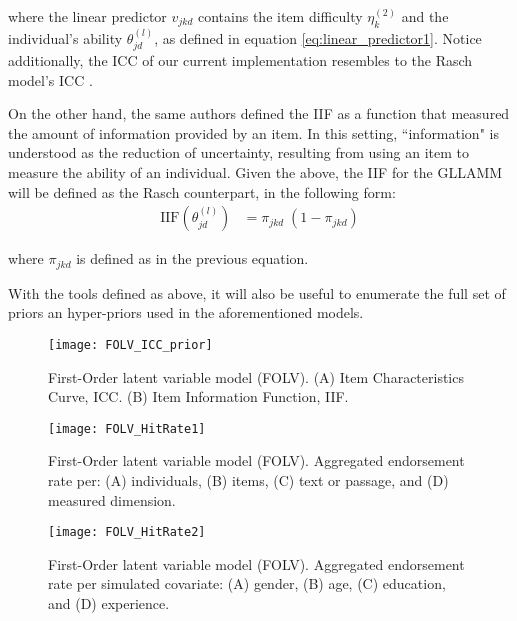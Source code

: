 \noindent where the linear predictor $v_{jkd}$ contains the item difficulty $\eta^{(2)}_{k}$ and the individual's ability $\theta^{(l)}_{jd}$, as defined in equation \ref{eq:linear_predictor1}. Notice additionally, the ICC of our current implementation resembles to the Rasch model's ICC \cite{Rasch_1980}.

On the other hand, the same authors defined the IIF as a function that measured the amount of information provided by an item. In this setting, ``information" is understood as the reduction of uncertainty, resulting from using an item to measure the ability of an individual. Given the above, the IIF for the GLLAMM will be defined as the Rasch counterpart, in the following form:
%
\begin{equation} \label{eq:IIF}
	\begin{split}
		\text{IIF} \left( \theta^{(l)}_{jd} \right) & = \pi_{jkd} \; (1 - \pi_{jkd})
	\end{split}	
\end{equation}

\noindent where $\pi_{jkd}$ is defined as in the previous equation.

With the tools defined as above, it will also be useful to enumerate the full set of priors an hyper-priors used in the aforementioned models.
%
\begin{figure}[H]
	\centering
	\texttt{[image: FOLV\_ICC\_prior]}
	\caption[First-Order latent variable model (FOLV). Item Characteristic Curve (ICC) and Item Information Function (IIF).]%
	{First-Order latent variable model (FOLV). (A) Item Characteristics Curve, ICC. (B) Item Information Function, IIF.}
	\label{fig:FOLV_ICC_prior}
\end{figure}
%
\begin{figure}[H]
	\centering
	\texttt{[image: FOLV\_HitRate1]}
	\caption[First-Order latent variable model (FOLV). Hit rate per dimensions of interest.]%
	{First-Order latent variable model (FOLV). Aggregated endorsement rate per: (A) individuals, (B) items, (C) text or passage, and (D) measured dimension.}
	\label{fig:FOLV_hitrate1}
\end{figure}
%
\begin{figure}[h]
	\centering
	\texttt{[image: FOLV\_HitRate2]}
	\caption[First-Order latent variable model (FOLV). Hit rate per simulated covariate.]%
	{First-Order latent variable model (FOLV). Aggregated endorsement rate per simulated covariate: (A) gender, (B) age, (C) education, and (D) experience.}
	\label{fig:FOLV_hitrate2}
\end{figure}


